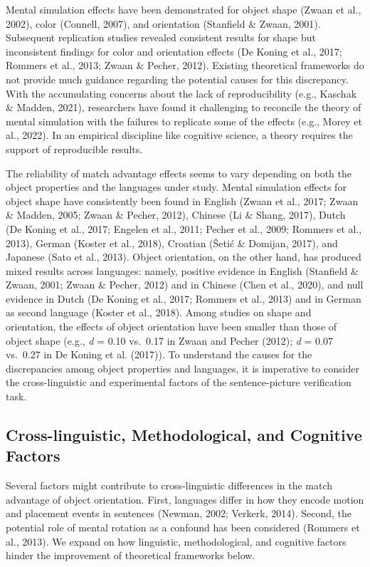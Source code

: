 \documentclass[
  man,floatsintext]{apa7}
\begin{document}
Mental simulation effects have been demonstrated for object shape
(Zwaan et al., 2002), color
(Connell, 2007), and orientation
(Stanfield \& Zwaan, 2001). Subsequent replication studies revealed
consistent results for shape but inconsistent findings for color and
orientation effects (De Koning et al., 2017; Rommers et al., 2013; Zwaan \& Pecher, 2012). Existing theoretical frameworks
do not provide much guidance regarding the potential causes for this
discrepancy. With the accumulating concerns about the lack of
reproducibility (e.g., Kaschak \& Madden, 2021), researchers
have found it challenging to reconcile the theory of mental simulation
with the failures to replicate some of the effects (e.g., Morey et al., 2022).
In an empirical discipline like cognitive science, a theory requires the
support of reproducible results.

The reliability of match advantage effects seems to vary depending on
both the object properties and the languages under study. Mental
simulation effects for object shape have consistently been found in
English (Zwaan et al., 2017; Zwaan \& Madden, 2005; Zwaan \& Pecher, 2012), Chinese (Li \& Shang, 2017),
Dutch (De Koning et al., 2017; Engelen et al., 2011; Pecher et al., 2009; Rommers et al., 2013), German
(Koster et al., 2018), Croatian
(Šetić \& Domijan, 2017), and Japanese
(Sato et al., 2013). Object orientation, on the other hand, has
produced mixed results across languages: namely, positive evidence in
English (Stanfield \& Zwaan, 2001; Zwaan \& Pecher, 2012)
and in Chinese (Chen et al., 2020), and null evidence in Dutch
(De Koning et al., 2017; Rommers et al., 2013) and in German
as second language (Koster et al., 2018). Among studies on
shape and orientation, the effects of object orientation have been
smaller than those of object shape (e.g., \emph{d} = 0.10 vs.~0.17 in
Zwaan and Pecher (2012); \emph{d} = 0.07 vs.~0.27 in
De Koning et al. (2017)). To understand the causes for the discrepancies
among object properties and languages, it is imperative to consider the
cross-linguistic and experimental factors of the sentence-picture
verification task.

\hypertarget{cross-linguistic-methodological-and-cognitive-factors}{%
\subsection{Cross-linguistic, Methodological, and Cognitive Factors}\label{cross-linguistic-methodological-and-cognitive-factors}}

Several factors might contribute to cross-linguistic differences in the
match advantage of object orientation. First, languages differ in how
they encode motion and placement events in sentences
(Newman, 2002; Verkerk, 2014). Second, the
potential role of mental rotation as a confound has been considered
(Rommers et al., 2013). We expand on how linguistic,
methodological, and cognitive factors hinder the improvement of
theoretical frameworks below.
\end{document}

